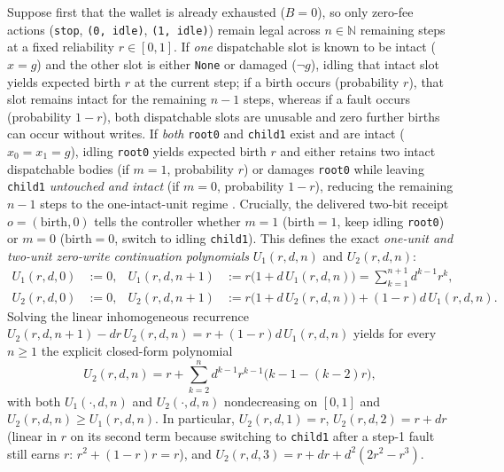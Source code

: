 \documentclass[11pt,a4paper]{article}
\begin{document}
Suppose first that the wallet is already exhausted (\(B = 0\)), so only
zero-fee actions (\texttt{stop}, \texttt{(0,\ idle)},
\texttt{(1,\ idle)}) remain legal across \(n \in \mathbb{N}\) remaining
steps at a fixed reliability \(r \in [0,1]\). If \emph{one} dispatchable
slot is known to be intact (\(x = g\)) and the other slot is either
\texttt{None} or damaged (\(\neg g\)), idling that intact slot yields
expected birth \(r\) at the current step; if a birth occurs (probability
\(r\)), that slot remains intact for the remaining \(n-1\) steps,
whereas if a fault occurs (probability \(1-r\)), both dispatchable slots
are unusable and zero further births can occur without writes. If
\emph{both} \texttt{root0} and \texttt{child1} exist and are intact
(\(x_0 = x_1 = g\)), idling \texttt{root0} yields expected birth \(r\)
and either retains two intact dispatchable bodies (if \(m = 1\),
probability \(r\)) or damages \texttt{root0} while leaving
\texttt{child1} \emph{untouched and intact} (if \(m = 0\), probability
\(1-r\)), reducing the remaining \(n-1\) steps to the one-intact-unit
regime \citep{barlowProschan1975, ross1970}. Crucially, the delivered
two-bit receipt \(o = (\mathrm{birth}, 0)\) tells the controller whether
\(m = 1\) (\(\mathrm{birth} = 1\), keep idling \texttt{root0}) or
\(m = 0\) (\(\mathrm{birth} = 0\), switch to idling \texttt{child1}).
This defines the exact \emph{one-unit and two-unit zero-write
continuation polynomials} \(U_1(r, d, n)\) and \(U_2(r, d, n)\):
\[\begin{aligned}
U_1(r, d, 0) &:= 0, & U_1(r, d, n+1) &:= r\bigl(1 + d\, U_1(r, d, n)\bigr) = \sum_{k=1}^{n+1} d^{k-1} r^k, \\
U_2(r, d, 0) &:= 0, & U_2(r, d, n+1) &:= r\bigl(1 + d\, U_2(r, d, n)\bigr) + (1 - r) d\, U_1(r, d, n).
\end{aligned}\] Solving the linear inhomogeneous recurrence
\(U_2(r, d, n+1) - d r\, U_2(r, d, n) = r + (1 - r) d\, U_1(r, d, n)\)
yields for every \(n \ge 1\) the explicit closed-form polynomial
\[U_2(r, d, n) = r + \sum_{k=2}^{n} d^{k-1} r^{k-1}\bigl(k - 1 - (k - 2)r\bigr),\]
with both \(U_1(\cdot, d, n)\) and \(U_2(\cdot, d, n)\) nondecreasing on
\([0,1]\) and \(U_2(r, d, n) \ge U_1(r, d, n)\). In particular,
\(U_2(r, d, 1) = r\), \(U_2(r, d, 2) = r + d r\) (linear in \(r\) on its
second term because switching to \texttt{child1} after a step-1 fault
still earns \(r\): \(r^2 + (1-r)r = r\)), and
\(U_2(r, d, 3) = r + d r + d^2(2r^2 - r^3)\).
\end{document}
